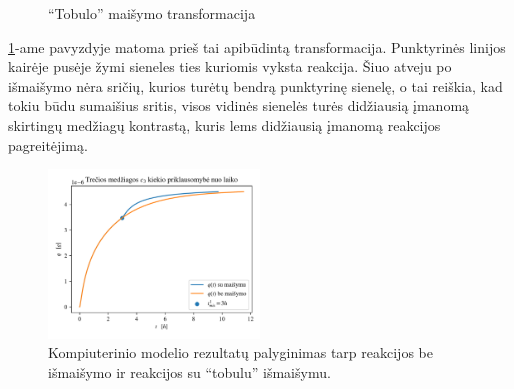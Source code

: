 \begin{figure}[!h]
\centering
{}
\caption{\enquote{Tobulo} maišymo transformacija}
\label{perfect-2x2-mix}
\end{figure}
\ref{perfect-2x2-mix}-ame pavyzdyje matoma prieš tai apibūdintą transformacija. Punktyrinės linijos kairėje pusėje žymi sieneles ties kuriomis vyksta reakcija. Šiuo atveju po išmaišymo nėra sričių, kurios turėtų bendrą punktyrinę sienelę, o tai reiškia, kad tokiu būdu sumaišius sritis, visos vidinės sienelės turės didžiausią įmanomą skirtingų medžiagų kontrastą, kuris lems didžiausią įmanomą reakcijos pagreitėjimą.
\newpage
\begin{figure}[h!]
    \centering
    \includegraphics[width=0.5\textwidth]{../paper/assets/optimal-mix-qnt-1.png}

    \caption{Kompiuterinio modelio rezultatų palyginimas tarp reakcijos be išmaišymo ir reakcijos su \enquote{tobulu} išmaišymu.  }

    \label{optimal-mix-qnt}
\end{figure}

